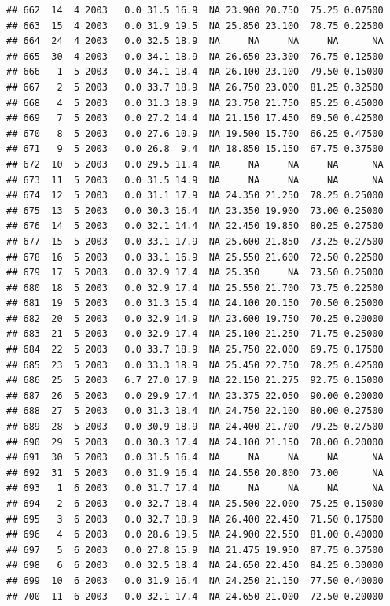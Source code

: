 \documentclass[
]{book}
\begin{document}
\begin{verbatim}
## 662  14  4 2003   0.0 31.5 16.9  NA 23.900 20.750  75.25 0.07500
## 663  15  4 2003   0.0 31.9 19.5  NA 25.850 23.100  78.75 0.22500
## 664  24  4 2003   0.0 32.5 18.9  NA     NA     NA     NA      NA
## 665  30  4 2003   0.0 34.1 18.9  NA 26.650 23.300  76.75 0.12500
## 666   1  5 2003   0.0 34.1 18.4  NA 26.100 23.100  79.50 0.15000
## 667   2  5 2003   0.0 33.7 18.9  NA 26.750 23.000  81.25 0.32500
## 668   4  5 2003   0.0 31.3 18.9  NA 23.750 21.750  85.25 0.45000
## 669   7  5 2003   0.0 27.2 14.4  NA 21.150 17.450  69.50 0.42500
## 670   8  5 2003   0.0 27.6 10.9  NA 19.500 15.700  66.25 0.47500
## 671   9  5 2003   0.0 26.8  9.4  NA 18.850 15.150  67.75 0.37500
## 672  10  5 2003   0.0 29.5 11.4  NA     NA     NA     NA      NA
## 673  11  5 2003   0.0 31.5 14.9  NA     NA     NA     NA      NA
## 674  12  5 2003   0.0 31.1 17.9  NA 24.350 21.250  78.25 0.25000
## 675  13  5 2003   0.0 30.3 16.4  NA 23.350 19.900  73.00 0.25000
## 676  14  5 2003   0.0 32.1 14.4  NA 22.450 19.850  80.25 0.27500
## 677  15  5 2003   0.0 33.1 17.9  NA 25.600 21.850  73.25 0.27500
## 678  16  5 2003   0.0 33.1 16.9  NA 25.550 21.600  72.50 0.22500
## 679  17  5 2003   0.0 32.9 17.4  NA 25.350     NA  73.50 0.25000
## 680  18  5 2003   0.0 32.9 17.4  NA 25.550 21.700  73.75 0.22500
## 681  19  5 2003   0.0 31.3 15.4  NA 24.100 20.150  70.50 0.25000
## 682  20  5 2003   0.0 32.9 14.9  NA 23.600 19.750  70.25 0.20000
## 683  21  5 2003   0.0 32.9 17.4  NA 25.100 21.250  71.75 0.25000
## 684  22  5 2003   0.0 33.7 18.9  NA 25.750 22.000  69.75 0.17500
## 685  23  5 2003   0.0 33.3 18.9  NA 25.450 22.750  78.25 0.42500
## 686  25  5 2003   6.7 27.0 17.9  NA 22.150 21.275  92.75 0.15000
## 687  26  5 2003   0.0 29.9 17.4  NA 23.375 22.050  90.00 0.20000
## 688  27  5 2003   0.0 31.3 18.4  NA 24.750 22.100  80.00 0.27500
## 689  28  5 2003   0.0 30.9 18.9  NA 24.400 21.700  79.25 0.27500
## 690  29  5 2003   0.0 30.3 17.4  NA 24.100 21.150  78.00 0.20000
## 691  30  5 2003   0.0 31.5 16.4  NA     NA     NA     NA      NA
## 692  31  5 2003   0.0 31.9 16.4  NA 24.550 20.800  73.00      NA
## 693   1  6 2003   0.0 31.7 17.4  NA     NA     NA     NA      NA
## 694   2  6 2003   0.0 32.7 18.4  NA 25.500 22.000  75.25 0.15000
## 695   3  6 2003   0.0 32.7 18.9  NA 26.400 22.450  71.50 0.17500
## 696   4  6 2003   0.0 28.6 19.5  NA 24.900 22.550  81.00 0.40000
## 697   5  6 2003   0.0 27.8 15.9  NA 21.475 19.950  87.75 0.37500
## 698   6  6 2003   0.0 32.5 18.4  NA 24.650 22.450  84.25 0.30000
## 699  10  6 2003   0.0 31.9 16.4  NA 24.250 21.150  77.50 0.40000
## 700  11  6 2003   0.0 32.1 17.4  NA 24.650 21.000  72.50 0.20000

\end{verbatim}
\end{document}
